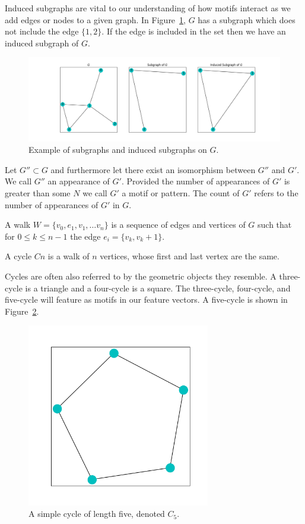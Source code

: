 \noindent Induced subgraphs are vital to our understanding of how motifs interact as we add edges or nodes
to a given graph. In Figure~\ref{fig:subgraph}, $G$ has a subgraph which does not include the edge $\{1,2\}$. If
the edge is included in the set then we have an induced subgraph of $G$.

\begin{figure}[h!]
    \includegraphics[width=0.8\linewidth]{Images/subgraph.png}
    \centering
    \caption{Example of subgraphs and induced subgraphs on $G$.\label{fig:subgraph}}
\end{figure}

\begin{dfn}
    Let $G'' \subset G$ and furthermore let there exist an isomorphism between $G''$ and $G'$. We call
    $G''$ an appearance of $G'$. Provided the number of appearances of $G'$ is greater than some $N$ we call $G'$
    a motif or pattern. The count of $G'$ refers to the number of appearances of $G'$ in $G$. 
\end{dfn}

\begin{dfn}
    A walk $W = \{v_0, e_1, v_1, \dots v_n\}$ is a sequence of edges and vertices of $G$ such that
    for $0 \leq k \leq n-1$ the edge $e_i = \{v_k, v_k+1\}$.
\end{dfn}

\begin{dfn}
    A cycle $Cn$ is a walk of $n$ vertices, whose first and last vertex are the same.
\end{dfn}

Cycles are often also referred to by the geometric objects they resemble. A three-cycle is a triangle and a four-cycle is a square.
The three-cycle, four-cycle, and five-cycle will feature as motifs in our feature vectors. A five-cycle is shown in 
Figure~\ref{fig:cycle}. 

\begin{figure}[h!]
    \includegraphics[width=8cm]{Images/Cycle.png}
    \centering
    \caption{A simple cycle of length five, denoted $C_{5}$.\label{fig:cycle}}
\end{figure}

